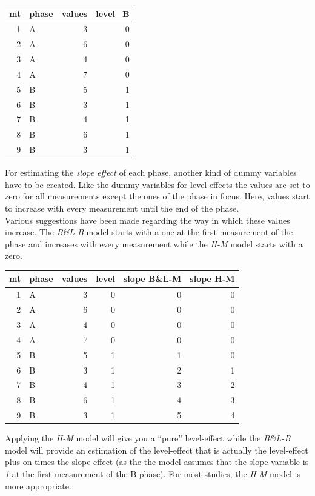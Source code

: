 \documentclass[
  letterpaper,
  DIV=11,
  numbers=noendperiod]{scrreprt}
\begin{document}
\begin{longtable}[]{@{}rlrr@{}}
\toprule()
mt & phase & values & level\_B \\
\midrule()
\endhead
1 & A & 3 & 0 \\
2 & A & 6 & 0 \\
3 & A & 4 & 0 \\
4 & A & 7 & 0 \\
5 & B & 5 & 1 \\
6 & B & 3 & 1 \\
7 & B & 4 & 1 \\
8 & B & 6 & 1 \\
9 & B & 3 & 1 \\
\bottomrule()
\end{longtable}

For estimating the \emph{slope effect} of each phase, another kind of
dummy variables have to be created. Like the dummy variables for level
effects the values are set to zero for all measurements except the ones
of the phase in focus. Here, values start to increase with every
measurement until the end of the phase.\\
Various suggestions have been made regarding the way in which these
values increase. The \emph{B\&L-B} model starts with a one at the first
measurement of the phase and increases with every measurement while the
\emph{H-M} model starts with a zero.

\begin{longtable}[]{@{}rlrrrr@{}}
\toprule()
mt & phase & values & level & slope B\&L-M & slope H-M \\
\midrule()
\endhead
1 & A & 3 & 0 & 0 & 0 \\
2 & A & 6 & 0 & 0 & 0 \\
3 & A & 4 & 0 & 0 & 0 \\
4 & A & 7 & 0 & 0 & 0 \\
5 & B & 5 & 1 & 1 & 0 \\
6 & B & 3 & 1 & 2 & 1 \\
7 & B & 4 & 1 & 3 & 2 \\
8 & B & 6 & 1 & 4 & 3 \\
9 & B & 3 & 1 & 5 & 4 \\
\bottomrule()
\end{longtable}

Applying the \emph{H-M} model will give you a ``pure'' level-effect
while the \emph{B\&L-B} model will provide an estimation of the
level-effect that is actually the level-effect plus on times the
slope-effect (as the the model assumes that the slope variable is
\emph{1} at the first measurement of the B-phase). For most studies, the
\emph{H-M} model is more appropriate.
\end{document}
